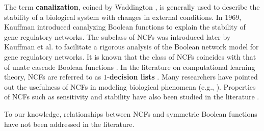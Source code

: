 The term \textbf{canalization}, coined by
Waddington \cite{Waddington-1942}, is generally used to describe
the stability of a biological system with changes
in external conditions.
In 1969, Kauffman \cite{Kauffman-1969} introduced canalyzing Boolean functions
to explain the stability of gene regulatory networks.
The subclass of NCFs was
introduced later by Kauffman et al. \cite{Kauffman-etal-2003} 
to facilitate a rigorous analysis of the Boolean network model
for gene regulatory networks.
It is known that the class of NCFs coincides with that
of unate cascade Boolean functions \cite{Jarrah-etal-2007}.
In the literature on computational learning theory,
NCFs are referred to as $1$-\textbf{decision lists} \cite{KV-1994}.
Many researchers have pointed out the usefulness of NCFs 
in modeling biological phenomena 
(e.g., \cite{Layne-2011,
Layne-etal-2012,Li-etal-2011,Li-etal-2012,Li-etal-2013}).
Properties of NCFs such as sensitivity and 
stability have also been studied in the 
literature \cite{Kauffman-etal-2004, Layne-2011,Layne-etal-2012,
Li-etal-2011,Li-etal-2013,Klotz-etal-2013, Stearns-etal-2018}. 

To our knowledge, relationships between NCFs and symmetric
Boolean functions have not been addressed in the literature.
